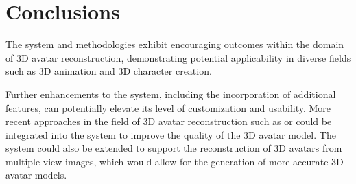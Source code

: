 \section{Conclusions}\label{sec:conclusions}

The system and methodologies exhibit encouraging outcomes within the domain of 3D avatar reconstruction, demonstrating potential applicability in diverse fields such as 3D animation and 3D character creation.

Further enhancements to the system, including the incorporation of additional features, can potentially elevate its level of customization and usability. More recent approaches in the field of 3D avatar reconstruction such as  or  could be integrated into the system to improve the quality of the 3D avatar model. The system could also be extended to support the reconstruction of 3D avatars from multiple-view images, which would allow for the generation of more accurate 3D avatar models.
